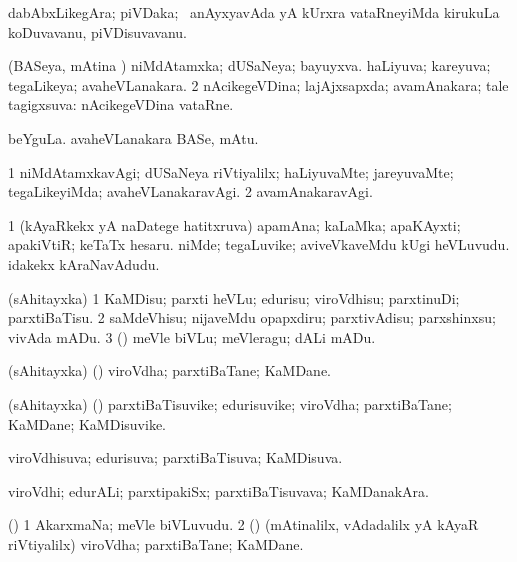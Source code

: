 \bentry
{}
\gl{\nA}
\bmng
dabAbxLikegAra; piVDaka; \kanmu\ anAyxyavAda yA kUrxra vataRneyiMda kirukuLa koDuvavanu, piVDisuvavanu. 
\emng
\eentry

\bentry
{}
\gl{\gu}
\bmng
\bnum
{} (BASeya, mAtina \vi) 
\banum
{} niMdAtamxka; dUSaNeya; bayuyxva. 
 haLiyuva; kareyuva; tegaLikeya; avaheVLanakara. 
\eanum
\numie
\num{2} nAcikegeVDina; lajAjxsapxda; avamAnakara; tale tagigxsuva:  nAcikegeVDina vataRne. 
\enum
\emng

\noindent
\gl{\pagu}
\bmng
{} 
\banum
{} beYguLa. 
 avaheVLanakara BASe, mAtu. 
\eanum
\emng
\eentry

\bentry
{}
\gl{\kirxvi}
\bmng
\bnum
\num{1} niMdAtamxkavAgi; dUSaNeya riVtiyalilx; haLiyuvaMte; jareyuvaMte; tegaLikeyiMda; avaheVLanakaravAgi. 
\num{2} avamAnakaravAgi. 
\enum
\emng
\eentry

\bentry
{}
\gl{\nA}
\bmng
\bnum
\num{1} (kAyaRkekx yA naDatege hatitxruva) apamAna; kaLaMka; apaKAyxti; apakiVtiR; keTaTx hesaru. 
\banum
{} niMde; tegaLuvike; aviveVkaveMdu kUgi heVLuvudu. 
 idakekx kAraNavAdudu. 
\eanum
\numie
\enum
\emng
\eentry

\bentry
{}
\gl{\sakirx}
\bmng
(sAhitayxka) 
\bnum
\num{1} KaMDisu; parxti heVLu; edurisu; viroVdhisu; parxtinuDi; parxtiBaTisu. 
\num{2} saMdeVhisu; nijaveMdu opapxdiru; parxtivAdisu; parxshinxsu; vivAda mADu. 
\num{3} (\viparx) meVle biVLu; meVleragu; dALi mADu. 
\enum
\emng
\eentry

\bentry
{}
\gl{\nA}
\bmng
(sAhitayxka) (\viparx) viroVdha; parxtiBaTane; KaMDane. 
\emng
\eentry

\bentry
{}
\gl{\nA}
\bmng
(sAhitayxka) (\viparx) parxtiBaTisuvike; edurisuvike; viroVdha; parxtiBaTane; KaMDane; KaMDisuvike. 
\emng
\eentry

\bentry
{}
\gl{\gu}
\bmng
viroVdhisuva; edurisuva; parxtiBaTisuva; KaMDisuva. 
\emng
\eentry

\bentry
{}
\gl{\nA}
\bmng
viroVdhi; edurALi; parxtipakiSx; parxtiBaTisuvava; KaMDanakAra. 
\emng
\eentry

\bentry
{}
\gl{\nA}
\bmng
(\viparx) 
\bnum
\num{1} AkarxmaNa; meVle biVLuvudu. 
\num{2} (\rUpa) (mAtinalilx, vAdadalilx yA kAyaR riVtiyalilx) viroVdha; parxtiBaTane; KaMDane. 
\enum
\emng
\eentry

